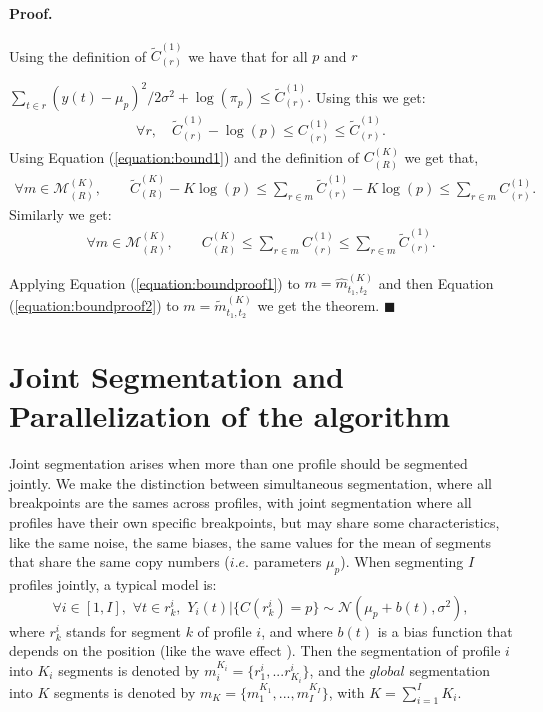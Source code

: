 \documentclass[11pt]{llncs}
\begin{document}
\paragraph{Proof.} 
Using the definition of $\widetilde{C}_{(r)}^{(1)}$ we have that for all $p$ and $r$

$  \sum_{t \in r}{(y(t) - \mu_p)^2} /{2\sigma^2 } + \log(\pi_p) \leq  \widetilde{C}_{(r)}^{(1)}.$
Using this we get:
\begin{eqnarray}
\forall r,  \quad \widetilde{C}_{(r)}^{(1)} -\log(p) \leq {C}_{(r)}^{(1)} \leq \widetilde{C}_{(r)}^{(1)} \label{equation:bound1}.
\end{eqnarray}
Using Equation (\ref{equation:bound1}) and the definition of ${C}_{(R)}^{(K)}$ we get that, 
\begin{eqnarray} 
\forall m \in \mathcal{M}^{(K)}_{(R)}, \qquad
\widetilde{C}_{(R)}^{(K)} - K\log(p) \leq \sum_{r \in m} \widetilde{C}_{(r)}^{(1)} - K \log(p) \leq   \sum_{r \in m} {C}_{(r)}^{(1)} .
\label{equation:boundproof1}\end{eqnarray}
Similarly we get:
\begin{eqnarray} 
\forall m \in \mathcal{M}^{(K)}_{(R)}, \qquad
{C}_{(R)}^{(K)} \leq \sum_{r \in m} {C}_{(r)}^{(1)} \leq   \sum_{r \in m} \widetilde{C}_{(r)}^{(1)} .
\label{equation:boundproof2}\end{eqnarray}

Applying Equation (\ref{equation:boundproof1}) to $m = \widehat{m}_{t_1, t_2}^{(K)}$ and then Equation (\ref{equation:boundproof2})
to $m =  \widetilde{m}_{t_1, t_2}^{(K)}$ we get the theorem. $\blacksquare$

\section{Joint Segmentation and Parallelization of the algorithm}

Joint segmentation arises when more than one profile should be segmented jointly. We make the distinction between simultaneous segmentation, where all breakpoints are the sames across profiles, with joint segmentation where all profiles have their own specific breakpoints, but may share some characteristics, like the same noise, the same biases, the same values for the mean of segments that share the same copy numbers ($i.e.$ parameters $\mu_p$). When segmenting $I$ profiles jointly, a typical model is: 
$$
\forall i \in [1,I],\,\, \forall t \in r_k^i, \,\, Y_i(t)|\{C(r_k^i)=p\} \sim \mathcal{N}(\mu_p+b(t),\sigma^2),
$$
where ${r_k^i}$ stands for segment $k$ of profile $i$, and where $b(t)$ is a bias function that depends on the position (like the wave effect \cite{PLH11}). Then the segmentation of profile $i$ into $K_i$ segments is denoted by $m_{i}^{K_i}=\{r_1^i,...r_{K_i}^i\}$, and the $global$ segmentation into $K$ segments is denoted by $m_K=\{m_1^{K_1}, ..., m_{I}^{K_I}\}$, with $K=\sum_{i=1}^I K_i$.
\end{document}
